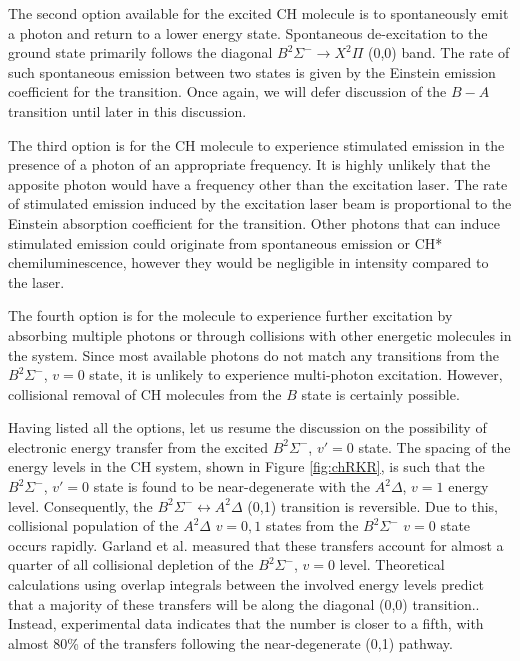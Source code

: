 The second option available for the excited CH molecule is to spontaneously emit a photon and return to a lower energy state.
Spontaneous de-excitation to the ground state primarily follows the diagonal \(B^2\Sigma^-\rightarrow X^2\Pi\) (0,0) band.
The rate of such spontaneous emission between two states is given by the Einstein emission coefficient for the transition.
Once again, we will defer discussion of the \(B-A\) transition until later in this discussion.

The third option is for the CH molecule to experience stimulated emission in the presence of a photon of an appropriate frequency.
It is highly unlikely that the apposite photon would have a frequency other than the excitation laser.
The rate of stimulated emission induced by the excitation laser beam is proportional to the Einstein absorption coefficient for the transition.
Other photons that can induce stimulated emission could originate from spontaneous emission or CH* chemiluminescence, however they would be negligible in intensity compared to the laser.

The fourth option is for the molecule to experience further excitation by absorbing multiple photons or through collisions with other energetic molecules in the system.
Since most available photons do not match any transitions from the \(B^2\Sigma^-\), \(v=0\) state, it is unlikely to experience multi-photon excitation.
However, collisional removal of CH molecules from the \(B\) state is certainly possible.



Having listed all the options, let us resume the discussion on the possibility of electronic energy transfer from the excited \(B^2\Sigma^-\), \(v'=0\) state.
The spacing of the energy levels in the CH system, shown in Figure \ref{fig:chRKR}, is such that the \(B^2\Sigma^-\), \(v'=0\) state is found to be near-degenerate with the \(A^2\Delta\), \(v=1\) energy level.
Consequently, the \(B^2\Sigma^-\leftrightarrow A^2\Delta\) (0,1) transition is reversible.
Due to this, collisional population of the \(A^2\Delta\) \(v=0,1\) states from the \(B^2\Sigma^-\) \(v=0\) state occurs rapidly.
Garland et al.\cite{1985-garland-b} measured that these transfers account for almost a quarter of all collisional depletion of the \(B^2\Sigma^-\), \(v=0\) level.
Theoretical calculations using overlap integrals between the involved energy levels predict that a majority of these transfers will be along the diagonal (0,0) transition.\cite{2000-luque}.
Instead, experimental data indicates that the number is closer to a fifth, with almost 80\% of the transfers following the near-degenerate (0,1) pathway.

